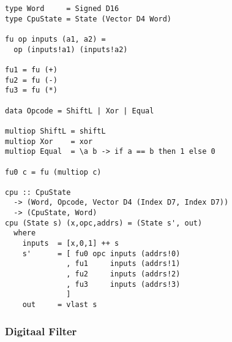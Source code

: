 \documentclass{paper}
\begin{document}
\begin{lstlisting}[label=Simple_CPU,caption=Simple CPU,float=t]
type Word     = Signed D16
type CpuState = State (Vector D4 Word)

fu op inputs (a1, a2) =
  op (inputs!a1) (inputs!a2)

fu1 = fu (+)
fu2 = fu (-)
fu3 = fu (*)

data Opcode = ShiftL | Xor | Equal

multiop ShiftL = shiftL
multiop Xor    = xor
multiop Equal  = \a b -> if a == b then 1 else 0

fu0 c = fu (multiop c)

cpu :: CpuState
  -> (Word, Opcode, Vector D4 (Index D7, Index D7))
  -> (CpuState, Word)
cpu (State s) (x,opc,addrs) = (State s', out)
  where
    inputs  = [x,0,1] ++ s
    s'      = [ fu0 opc inputs (addrs!0)
              , fu1     inputs (addrs!1)
              , fu2     inputs (addrs!2)
              , fu3     inputs (addrs!3)
              ]
    out     = vlast s
\end{lstlisting}

\subsubsection*{Digitaal Filter} %
\label{ssub:digitaal_filter}

\end{document}
